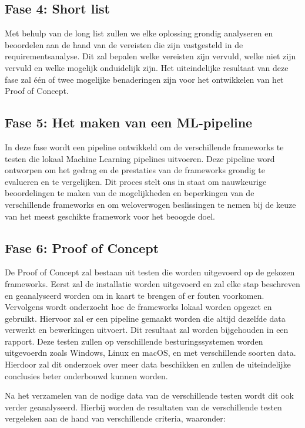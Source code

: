 \subsection{Fase 4: Short list}
Met behulp van de long list zullen we elke oplossing grondig analyseren en beoordelen aan de hand van de vereisten die zijn vastgesteld in de requirementsanalyse. Dit zal bepalen welke vereisten zijn vervuld, welke niet zijn vervuld en welke mogelijk onduidelijk zijn. Het uiteindelijke resultaat van deze fase zal één of twee mogelijke benaderingen zijn voor het ontwikkelen van het Proof of Concept.
\subsection{Fase 5: Het maken van een ML-pipeline}
In deze fase wordt een pipeline ontwikkeld om de verschillende frameworks te testen die lokaal Machine Learning pipelines uitvoeren. Deze pipeline word ontworpen om het gedrag en de prestaties van de frameworks grondig te evalueren en te vergelijken. Dit proces stelt ons in staat om nauwkeurige beoordelingen te maken van de mogelijkheden en beperkingen van de verschillende frameworks en om weloverwogen beslissingen te nemen bij de keuze van het meest geschikte framework voor het beoogde doel.
\subsection{Fase 6: Proof of Concept}
De Proof of Concept zal bestaan uit testen die worden uitgevoerd op de gekozen frameworks. Eerst zal de installatie worden uitgevoerd en zal elke stap beschreven en geanalyseerd worden om in kaart te brengen of er fouten voorkomen. Vervolgens wordt onderzocht hoe de frameworks lokaal worden opgezet en gebruikt. Hiervoor zal er een pipeline gemaakt worden die altijd dezelfde data verwerkt en bewerkingen uitvoert. Dit resultaat zal worden bijgehouden in een rapport.
Deze testen zullen op verschillende besturingssystemen worden uitgevoerdn zoals Windows, Linux en macOS, en met verschillende soorten data. Hierdoor zal dit onderzoek over meer data beschikken en zullen de uiteindelijke conclusies beter onderbouwd kunnen worden.

Na het verzamelen van de nodige data van de verschillende testen wordt dit ook verder geanalyseerd. Hierbij worden de resultaten van de verschillende testen vergeleken aan de hand van verschillende criteria, waaronder:

